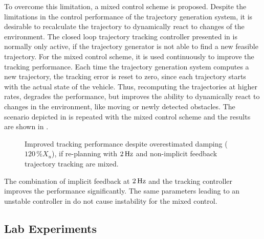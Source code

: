 To overcome this limitation, a mixed control scheme is proposed. Despite the limitations in the control performance of the trajectory generation system, it is desirable to recalculate the trajectory to dynamically react to changes of the environment.
The closed loop trajectory tracking controller presented in  is normally only active, if the trajectory generator is not able to find a new feasible trajectory. For the mixed control scheme, it is used continuously to improve the tracking performance. Each time the trajectory generation system computes a new trajectory, the tracking error is reset to zero, since each trajectory starts with the actual state of the vehicle. Thus, recomputing the trajectories at higher rates, degrades the performance, but improves the ability to dynamically react to changes in the environment, like moving or newly detected obstacles. The scenario depicted in  is repeated with the mixed control scheme and the results are shown in .
\begin{figure}
	\centering
	
	\caption{Improved tracking performance despite overestimated damping ($120\,\% X_u$), if re-planning with $\unit[2]{Hz}$ and non-implicit feedback trajectory tracking are mixed.}
    \label{fig:improved-performance-mixed-control}
\end{figure}
The combination of implicit feedback at $\unit[2]{Hz}$ and the tracking controller improves the performance significantly. The same parameters leading to an unstable controller in  do not cause instability for the mixed control.
% 	

\newpage

\subsection{Lab Experiments}

